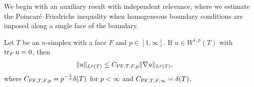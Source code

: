 \documentclass[10pt,a4paper]{article}
\begin{document}
We begin with an auxiliary result with independent relevance, where we estimate the Poincar\'e--Friedrichs inequality when homogeneous boundary conditions are imposed along a single face of the boundary. 

\begin{lemma}\label{lemma:mixedbconsimplex}
    Let $T$ be an $n$-simplex with a face $F$ and $p \in [1,\infty]$. 
    If $u \in W^{1,p}(T)$ with $\operatorname{tr}_{F} u = 0$, then 
    \begin{align*}
        \| u \|_{L^{p}(T)}
        &
        \leq 
        C_{{\rm PF},T,F,p} \| \nabla u \|_{L^{p}(T)}
        ,
    \end{align*}
    where $C_{{\rm PF},T,F,p} = p^{-\frac 1 p} {\delta}(T)$ for $p < \infty$ and $C_{{\rm PF},T,F,\infty} = {\delta}(T)$. 
\end{lemma}
\end{document}
